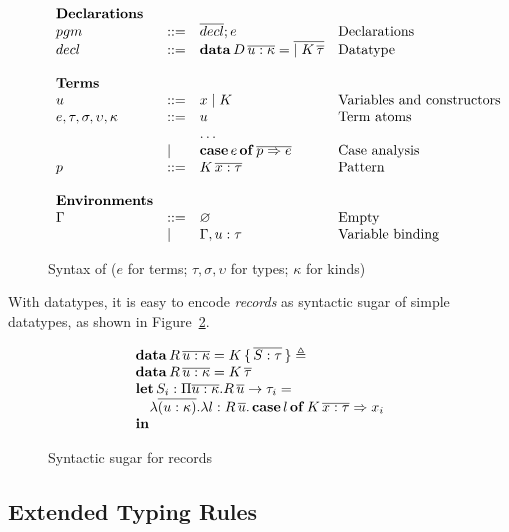 \begin{figure}[ht]
\centering
\small
\[
  \begin{array}{llll}
    \textbf{Declarations} \\
    pgm &::= & \overline{decl}; e & \text{Declarations} \\
    decl &::= & \mathbf{data}\,D\,\overline{u : \kappa} = \overline{\mid K\,\overline{\tau}} & \text{Datatype} \\ \\
    \textbf{Terms} \\
    u &::= & x \mid K & \text{Variables and constructors} \\
    e,\tau,\sigma,\upsilon,\kappa &::= & u & \text{Term atoms} \\
    & & \dots \\
    & \mid & \mathbf{case}\,e\,\mathbf{of}\,\overline{p \Rightarrow e} & \text{Case analysis} \\
    p &::= & K\,\overline{x : \tau} & \text{Pattern} \\ \\
    \textbf{Environments} \\
    \Gamma &::= &\varnothing & \text{Empty} \\
    & \mid & \Gamma,u:\tau & \text{Variable binding}
  \end{array}
\]
  \caption{Syntax of \sufcc ($e$ for terms; $\tau,\sigma,\upsilon$ for types; $\kappa$ for kinds)}\label{fig:datasyn}
\end{figure}

With datatypes, it is easy to encode \emph{records} as syntactic sugar of simple datatypes, as shown in Figure~\ref{fig:records}.

\begin{figure}[ht]
\centering
\[
  \begin{array}{l}
    \mathbf{data}\,R\,\overline{u : \kappa} = K\,\{\,\overline{S:\tau}\,\} \triangleq \\
    \mathbf{data}\,R\,\overline{u : \kappa} = K\,\overline{\tau} \\
    \mathbf{let}\,S_{i} : \Pi \overline{u : \kappa}.R\,\overline{u} \rightarrow \tau_{i} = \\
    \quad \lambda \overline{(u:\kappa)}.\lambda l:R\,\overline{u}.\,\mathbf{case}\,l\,\mathbf{of}\, K\,\overline{x:\tau} \Rightarrow x_{i} \\
    \mathbf{in}
  \end{array}
\]
\caption{Syntactic sugar for records}\label{fig:records}
\end{figure}

\subsection{Extended Typing Rules}

